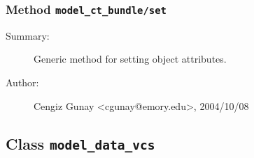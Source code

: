 \subsubsection[Method \texttt{set}]{Method \texttt{model\_ct\_bundle/set}}%
%
\label{ref_model_ct_bundle__set}%
\hypertarget{ref_model_ct_bundle__set}{}%
\begin{description}
\item[Summary:]Generic method for setting object attributes.
%
%
%
%
%
%
%
\item[Author:]%
Cengiz Gunay <cgunay@emory.edu>, 2004/10/08
%
\end{description}
\methodline%
\subsection{Class \texttt{model\_data\_vcs}}%
%
\label{ref_model_data_vcs}%
\hypertarget{ref_model_data_vcs}{}%
